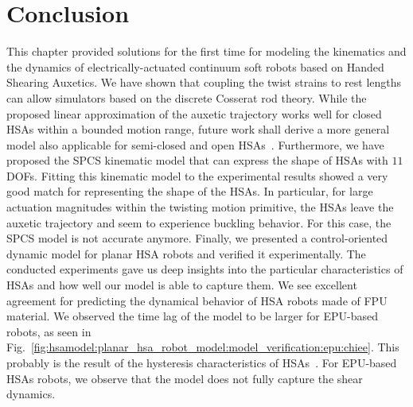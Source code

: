 \section{Conclusion}\label{sec:hsamodel:conclusion}
%
This chapter provided solutions for the first time for modeling the kinematics and the dynamics of electrically-actuated continuum soft robots based on Handed Shearing Auxetics.
%
We have shown that coupling the twist strains to rest lengths can allow simulators based on the discrete Cosserat rod theory. %
While the proposed linear approximation of the auxetic trajectory works well for closed \glspl{HSA} within a bounded motion range, future work shall derive a more general model also applicable for semi-closed and open \glspl{HSA}~\citep{good2022expanding}.
Furthermore, we have proposed the \gls{SPCS} kinematic model that can express the shape of \glspl{HSA} with $11$ \glspl{DOF}.
Fitting this kinematic model to the experimental results showed a very good match for representing the shape of the \glspl{HSA}. In particular, for large actuation magnitudes within the twisting motion primitive, the \glspl{HSA} leave the auxetic trajectory and seem to experience buckling behavior. For this case, the \gls{SPCS} model is not accurate anymore.
Finally, we presented a control-oriented dynamic model for planar \gls{HSA} robots and verified it experimentally.
The conducted experiments gave us deep insights into the particular characteristics of \glspl{HSA} and how well our model is able to capture them. We see excellent agreement for predicting the dynamical behavior of \gls{HSA} robots made of FPU material.
We observed the time lag of the model to be larger for EPU-based robots, as seen in Fig.~\ref{fig:hsamodel:planar_hsa_robot_model:model_verification:epu:chiee}. This probably is the result of the hysteresis characteristics of \glspl{HSA}~\citep{good2022expanding}.
For EPU-based \glspl{HSA} robots, we observe that the model does not fully capture the shear dynamics.
